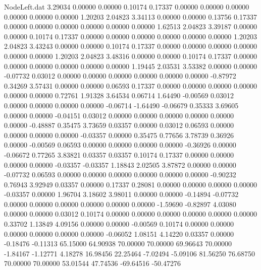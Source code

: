 \begin{filecontents}{NodeLeft.dat}
   3.29034    0.00000    0.00000     0.10174    0.17337    0.00000    0.00000    0.00000    0.00000    0.00000    0.00000    1.20203    2.04823
   3.34113    0.00000    0.00000     0.13756    0.17337    0.00000    0.00000    0.00000    0.00000    0.00000    0.00000    1.62513    2.04823
   3.39187    0.00000    0.00000     0.10174    0.17337    0.00000    0.00000    0.00000    0.00000    0.00000    0.00000    1.20203    2.04823
   3.43243    0.00000    0.00000     0.10174    0.17337    0.00000    0.00000    0.00000    0.00000    0.00000    0.00000    1.20203    2.04823
   3.48316    0.00000    0.00000     0.10174    0.17337    0.00000    0.00000    0.00000    0.00000    0.00000    0.00000    1.19445    2.03531
   3.53382    0.00000    0.00000    -0.07732    0.03012    0.00000    0.00000    0.00000    0.00000    0.00000    0.00000   -0.87972    0.34269
   3.57431    0.00000    0.00000     0.06593    0.17337    0.00000    0.00000    0.00000    0.00000    0.00000    0.00000    0.72761    1.91328
   3.64534    0.06714    1.64490    -0.00569    0.03012    0.00000    0.00000    0.00000    0.00000   -0.06714   -1.64490   -0.06679    0.35333
   3.69605    0.00000    0.00000    -0.04151    0.03012    0.00000    0.00000    0.00000    0.00000    0.00000    0.00000   -0.48887    0.35475
   3.73659    0.03357    0.00000     0.03012    0.06593    0.00000    0.00000    0.00000    0.00000   -0.03357    0.00000    0.35475    0.77656
   3.78739    0.36926    0.00000    -0.00569    0.06593    0.00000    0.00000    0.00000    0.00000   -0.36926    0.00000   -0.06672    0.77265
   3.83821    0.03357    0.03357     0.10174    0.17337    0.00000    0.00000    0.00000    0.00000   -0.03357   -0.03357    1.18843    2.02505
   3.87872    0.00000    0.00000    -0.07732    0.06593    0.00000    0.00000    0.00000    0.00000    0.00000    0.00000   -0.90232    0.76943
   3.92949    0.03357    0.00000     0.17337    0.28081    0.00000    0.00000    0.00000    0.00000   -0.03357    0.00000    1.96704    3.18602
   3.98011    0.00000    0.00000    -0.14894   -0.07732    0.00000    0.00000    0.00000    0.00000    0.00000    0.00000   -1.59690   -0.82897
   4.03080    0.00000    0.00000     0.03012    0.10174    0.00000    0.00000    0.00000    0.00000    0.00000    0.00000    0.33702    1.13849
   4.09156    0.00000    0.00000    -0.00569    0.10174    0.00000    0.00000    0.00000    0.00000    0.00000    0.00000   -0.06052    1.08151
   4.14220    0.03357    0.00000    -0.18476   -0.11313   65.15000   64.90938   70.00000   70.00000   69.96643   70.00000   -1.84167   -1.12771
   4.18278   16.98456   22.25464    -7.02494   -5.09106   81.56250   76.68750   70.00000   70.00000   53.01544   47.74536  -69.64516  -50.47276

\end{filecontents}
